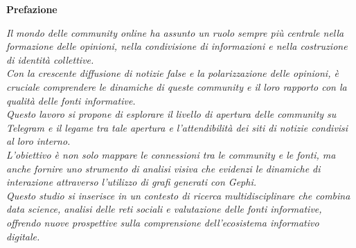 \documentclass[12pt]{article}
\begin{document}
	\newpage
	\pagestyle{plain}
	\begin{center}
		{\Large \begin{flushright}
				\textbf{Prefazione}
		\end{flushright}} %
	\end{center}
	
	\vspace{0.5cm} %
	
	\hspace{0.5cm} %
	\begin{flushleft}
		\textit{Il mondo delle community online ha assunto un ruolo sempre più centrale nella formazione delle opinioni, nella condivisione di informazioni e nella costruzione di identità collettive. \\Con la crescente diffusione di notizie false e la polarizzazione delle opinioni, è cruciale comprendere le dinamiche di queste community e il loro rapporto con la qualità delle fonti informative. \\Questo lavoro si propone di esplorare il livello di apertura delle community su Telegram e il legame tra tale apertura e l'attendibilità dei siti di notizie condivisi al loro interno. \\L'obiettivo è non solo mappare le connessioni tra le community e le fonti, ma anche fornire uno strumento di analisi visiva che evidenzi le dinamiche di interazione attraverso l'utilizzo di grafi generati con Gephi. \\Questo studio si inserisce in un contesto di ricerca multidisciplinare che combina data science, analisi delle reti sociali e valutazione delle fonti informative, offrendo nuove prospettive sulla comprensione dell'ecosistema informativo digitale.}
	\end{flushleft} %
	\vspace{0.5cm}
	
	
	\newpage
	\pagestyle{empty} %
	\vspace*{\fill} %
	\thispagestyle{empty} %
	
	\newpage
	\renewcommand{\contentsname}{Indice} %
	\tableofcontents %
	\clearpage
\end{document}
